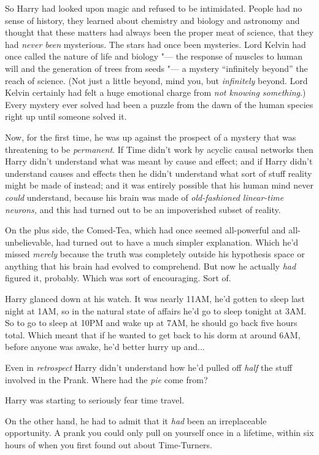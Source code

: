 So Harry had looked upon magic and refused to be intimidated. People had
no sense of history, they learned about chemistry and biology and
astronomy and thought that these matters had always been the proper meat
of science, that they had \emph{never been} mysterious. The stars had
once been mysteries. Lord Kelvin had once called the nature of life and
biology "--- the response of muscles to human will and the generation of
trees from seeds "--- a mystery ``infinitely beyond'' the reach of science.
(Not just a little beyond, mind you, but \emph{infinitely} beyond. Lord
Kelvin certainly had felt a huge emotional charge from \emph{not knowing
something}.) Every mystery ever solved had been a puzzle from the dawn
of the human species right up until someone solved it.

Now, for the first time, he was up against the prospect of a mystery
that was threatening to be \emph{permanent}. If Time didn't work by
acyclic causal networks then Harry didn't understand what was meant by
cause and effect; and if Harry didn't understand causes and effects then
he didn't understand what sort of stuff reality might be made of
instead; and it was entirely possible that his human mind never
\emph{could} understand, because his brain was made of
\emph{old-fashioned linear-time neurons,} and this had turned out to be
an impoverished subset of reality.

On the plus side, the Comed-Tea, which had once seemed all-powerful and
all-unbelievable, had turned out to have a much simpler explanation.
Which he'd missed \emph{merely} because the truth was completely outside
his hypothesis space or anything that his brain had evolved to
comprehend. But now he actually \emph{had} figured it, probably. Which
was sort of encouraging. Sort of.

Harry glanced down at his watch. It was nearly 11AM, he'd gotten to
sleep last night at 1AM, so in the natural state of affairs he'd go to
sleep tonight at 3AM. So to go to sleep at 10PM and wake up at 7AM, he
should go back five hours total. Which meant that if he wanted to get
back to his dorm at around 6AM, before anyone was awake, he'd better
hurry up and...

Even in \emph{retrospect} Harry didn't understand how he'd pulled off
\emph{half} the stuff involved in the Prank. Where had the \emph{pie}
come from?

Harry was starting to seriously fear time travel.

On the other hand, he had to admit that it \emph{had} been an
irreplaceable opportunity. A prank you could only pull on yourself once
in a lifetime, within six hours of when you first found out about
Time-Turners.

